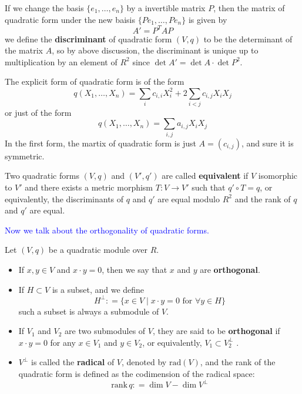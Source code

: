 \begin{remark}
    If we change the basis \(\{e_1,\dots,e_n\}\) by a invertible matrix \(P\), then the matrix of quadratic form under the new baisis \(\{Pe_1,\dots,Pe_n\}\) is given by
    \[A' = P^T A P\]
    we define the \textbf{discriminant} of quadratic form \((V,q)\) to be the determinant of the matrix \(A\), so by above discussion, the discriminant is unique up to multiplication by an element of \(R^2\) since \(\det A' = \det A \cdot \det P^2\).
\end{remark}

\begin{remark}
    The explicit form of quadratic form is of the form
    \[q(X_1,\dots,X_n) = \sum_i c_{i,i}X_i^2 + 2\sum_{i<j}c_{i,j}X_iX_j\]
    or just of the form 
    \[q(X_1,\dots,X_n) = \sum_{i,j} a_{i,j} X_i X_j\]
    In the first form, the martix of quadratic form is just \(A = (c_{i,j})\), and sure it is symmetric.

    Two quadratic forms \((V,q)\) and \((V',q')\) are called \textbf{equivalent} if \(V\) isomorphic to \(V'\) and there exists a metric morphism \(T: V \to V' \) such that \(q' \circ T = q\), or equivalently, the discriminants of \(q\) and \(q'\) are equal modulo \(R^2\) and the rank of \(q\) and \(q'\) are equal.
\end{remark}

\textcolor{blue}{Now we talk about the orthogonality of quadratic forms.}

\begin{definition}
    Let \((V,q)\) be a quadratic module over \(R\).

    \begin{itemize}
        \item If \(x,y \in V\) and \(x \cdot y = 0\), then we say that \(x\) and \(y\) are \textbf{orthogonal}.
        \item If \(H \subset V\) is a subset, and we define 
        \[H^\perp : = \{x \in V \mid x \cdot y =0 \text{ for } \forall y \in H\}\]
        such a subset is always a submodule of \(V\).
        \item If \(V_1\) and \(V_2\) are two submodules of \(V\), they are said to be \textbf{orthogonal} if \(x \cdot y =0 \) for any \(x \in V_1\) and \(y \in V_2\), or equivalently, \(V_1 \subset V_2^\perp\) .
        \item \(V^\perp \) is called the \textbf{radical} of \(V\), denoted by \(\mathrm{rad}(V)\), and the rank of the quadratic form is defined as the codimension of the radical space:
        \[\mathrm{rank}\, q : = \dim V - \dim V^\perp\]
    \end{itemize}
\end{definition}

